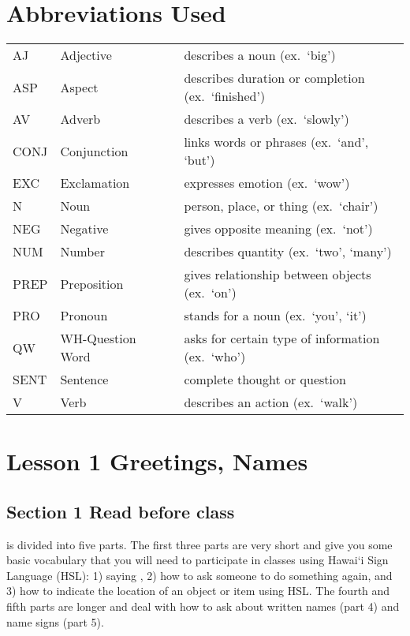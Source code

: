 \documentclass{tufte-book}
\begin{document}
\chapter{Abbreviations Used}

\begin{tabular}{l l l l}
AJ & Adjective&& describes a noun (ex.~`big')\index{adjective} \\
ASP & Aspect&&describes duration or completion \index{aspect} (ex.~`finished')\\
AV & Adverb&&describes a verb (ex.~`slowly') \index{adverb}\\
CONJ & Conjunction&&links words or phrases \index{conjunction} (ex.~`and', `but')\\
EXC & Exclamation&&expresses emotion \index{exclamation} (ex.~`wow')\\
N & Noun&&person, place, or thing \index{noun} (ex.~`chair')\\
NEG & Negative&&gives opposite meaning \index{negation} (ex.~`not')\\
NUM & Number&&describes quantity \index{number} (ex.~`two', `many')\\
PREP & Preposition&&gives relationship between objects \index{preposition} (ex.~`on')\\
PRO & Pronoun&&stands for a noun \index{pronoun} (ex.~`you', `it')\\
QW & WH-Question Word&&asks for certain type of information (ex.~`who') \index{question!question word}\\
SENT & Sentence&&complete thought or question\\
V & Verb&&describes an action \index{verb} (ex.~`walk')\\
\end{tabular}

\mainmatter

\chapter{Lesson 1 Greetings, Names}

\section{Section 1 Read before class}
 is divided into five parts. The first three parts are very short and give you some basic vocabulary that you will need to participate in classes using Hawai`i Sign Language (HSL): 1) saying 
, 2) how to ask someone to do something again, and 3) how to indicate the location of an object or item using HSL. The fourth and fifth parts are longer and deal with how to ask about written names (part 4) and name signs (part 5).
\end{document}

